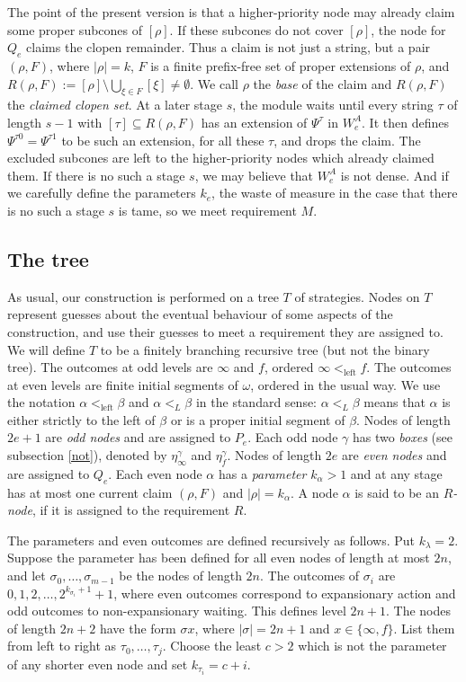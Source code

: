 \documentclass[11pt]{amsart}
\begin{document}
The point of the present version is that a higher-priority node may already
claim some proper subcones of $[\rho]$.  If these subcones do not cover
$[\rho]$, the node for $Q_e$ claims the clopen remainder.  Thus a claim is not
just a string, but a pair $(\rho,F)$,
where $|\rho|=k$, $F$ is a finite prefix-free set of proper extensions of
$\rho$, and $R(\rho,F):=[\rho]\setminus\bigcup_{\xi\in F}[\xi] \neq \emptyset$.
We call $\rho$ the \emph{base} of the claim and $R(\rho,F)$ the
\emph{claimed clopen set}.  At a later stage $s$, the module waits until every
string $\tau$ of length $s-1$ with $[\tau]\subseteq R(\rho,F)$ has an extension
of $\Psi^\tau$ in $W_e^A$.  It then defines $\Psi^{\tau 0}=\Psi^{\tau 1}$ to be
such an extension, for all these $\tau$, and drops the claim.  The excluded
subcones are left to the higher-priority nodes which already claimed them. If
there is no such a stage $s$, we may believe that $W_e^A$ is not dense. And if we carefully define the parameters $k_e$, the waste of measure in the case that there is no such a stage $s$ is tame, so we meet requirement $M$.

\subsection{The tree}
As usual, our construction is performed on a tree $T$ of
strategies. Nodes on $T$ represent guesses about
the eventual behaviour of some aspects of the construction, and use their
guesses to meet a requirement they are assigned to. We will define $T$ to be a finitely branching recursive tree (but not the binary tree). The
outcomes at odd levels are $\infty$ and $f$, ordered $\infty<_{\mathrm{left}}f$.
The outcomes at even levels are finite initial segments of $\omega$, ordered in
the usual way.  We use the notation $\alpha<_{\mathrm{left}}\beta$ and
$\alpha<_L\beta$ in the standard sense: $\alpha<_L\beta$ means that $\alpha$ is
either strictly to the left of $\beta$ or is a proper initial segment of
$\beta$.
Nodes of length $2e+1$ are \emph{odd nodes} and are assigned to $P_e$.  Each odd node
$\gamma$ has two \emph{boxes} (see subsection \ref{not}), denoted by $\eta_\infty^\gamma$ and $\eta_f^\gamma$.
Nodes of length $2e$ are \emph{even nodes} and are assigned to $Q_e$. Each even node
$\alpha$ has a \emph{parameter} $k_\alpha>1$ and at any stage has at most one current
claim $(\rho,F)$ and $|\rho|=k_\alpha$. A node $\alpha$ is said to be an {\emph{$R$-node}}, if it is assigned to the
requirement $R$.

The parameters and even outcomes are defined recursively as follows.  Put
$k_\lambda=2$.  Suppose the parameter has been defined for all even nodes of
length at most $2n$, and let $\sigma_0,\ldots,\sigma_{m-1}$ be the nodes of
length $2n$.  The outcomes of $\sigma_i$ are $0,1,2,\ldots, 2^{k_{\sigma_i}+1}+1$,
where even outcomes correspond to expansionary action and odd outcomes to
non-expansionary waiting.  This defines level $2n+1$.  The nodes of length
$2n+2$ have the form $\sigma x$, where $|\sigma|=2n+1$ and
$x\in\{\infty,f\}$.  List them from left to right as
$\tau_0,\ldots,\tau_j$.  Choose the least $c>2$ which is not the parameter of
any shorter even node and set $k_{\tau_i}=c+i$.
\end{document}
